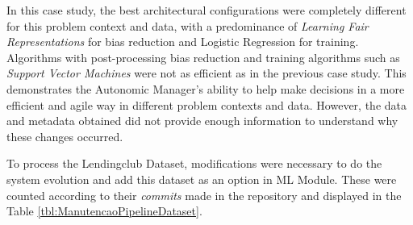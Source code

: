 \documentclass[sigconf]{acmart}
\begin{document}
\begin{table}[H]
\begin{center}
  \caption{Best configurations chosen by Autonomic Manager \\ 25\% Evaluation/75\% Fairness}
\label{tbl:ScoreMAPEKLendingclubOverall2575}
\end{center}
\end{table}

In this case study, the best architectural configurations were completely different for this problem context and data, with a predominance of \textit{Learning Fair Representations} for bias reduction and Logistic Regression for training. Algorithms with post-pro\-cess\-ing bias reduction and training algorithms such as \textit{Support Vector Machines} were not as efficient as in the previous case study. This demonstrates the Autonomic Manager's ability to help make decisions in a more efficient and agile way in different problem contexts and data. However, the data and metadata obtained did not provide enough information to understand why these changes occurred.

To process the Lendingclub Dataset, modifications were necessary to do the system evolution and add this dataset as an option in ML Module. These were counted according to their \textit{commits} made in the repository and displayed in the Table \ref{tbl:ManutencaoPipelineDataset}.
\end{document}
